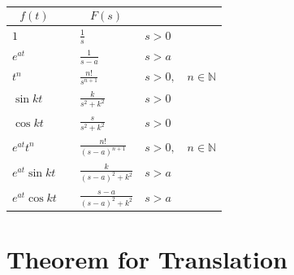\documentclass[
  letterpaper,
  DIV=11,
  numbers=noendperiod]{scrreprt}
\theoremstyle{plain}
\theoremstyle{remark}
\begin{document}
\begin{longtable}[]{@{}
  >{\raggedright\arraybackslash}p{}
  >{\raggedright\arraybackslash}p{}
  >{\raggedright\arraybackslash}p{}
  >{\raggedright\arraybackslash}p{}@{}}
\toprule\noalign{}
\begin{minipage}[b]{\linewidth}\raggedright
\[f(t)\]
\end{minipage} & \begin{minipage}[b]{\linewidth}\raggedright
\end{minipage} & \begin{minipage}[b]{\linewidth}\raggedright
\[F(s)\]
\end{minipage} & \begin{minipage}[b]{\linewidth}\raggedright
\end{minipage} \\
\midrule\noalign{}
\endhead
\bottomrule\noalign{}
\endlastfoot
\(1\) & & \(\frac{1}{s}\) & \(s>0\) \\
\(e^{at}\) & & \(\frac{1}{s-a}\) & \(s>a\) \\
\(t^n\) & & \(\frac{n!}{s^{n+1}}\) & \(s>0,\quad n\in \mathbb{N}\) \\
\(\sin kt\) & & \(\frac{k}{s^2+k^2}\) & \(s>0\) \\
\(\cos kt\) & & \(\frac{s}{s^2+k^2}\) & \(s>0\) \\
\(e^{at}t^n\) & & \(\frac{n!}{(s-a)^{n+1}}\) &
\(s>0,\quad n\in \mathbb{N}\) \\
\(e^{at}\sin kt\) & & \(\frac{k}{(s-a)^2+k^2}\) & \(s>a\) \\
\(e^{at}\cos kt\) & & \(\frac{s-a}{(s-a)^2+k^2}\) & \(s>a\) \\
\end{longtable}

\section{Theorem for Translation}\label{theorem-for-translation}
\end{document}

